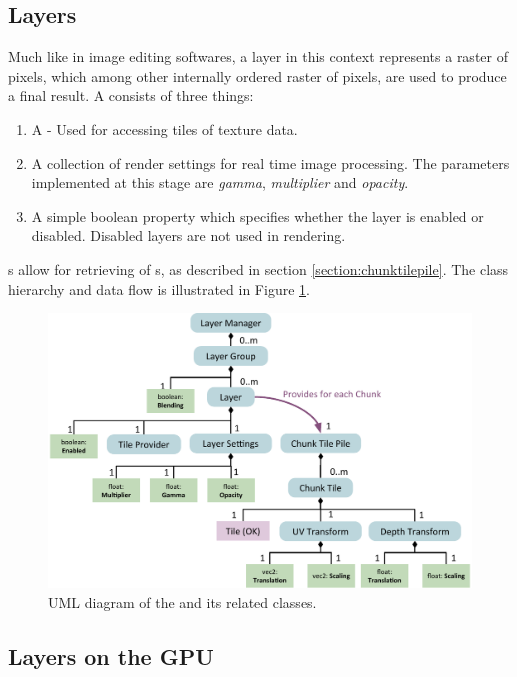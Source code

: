 \subsection{Layers}
Much like in image editing softwares, a layer in this context represents a raster of pixels, which among other internally ordered raster of pixels, are used to produce a final result. A  consists of three things:

\begin{enumerate}
\item A  - Used for accessing tiles of texture data.
\item A collection of render settings for real time image processing. The parameters implemented at this stage are \emph{gamma}, \emph{multiplier} and \emph{opacity}.
\item A simple boolean property which specifies whether the layer is enabled or disabled. Disabled layers are not used in rendering.
\end{enumerate}

s allow for retrieving of s, as described in section \ref{section:chunktilepile}. The class hierarchy and data flow is illustrated in Figure \ref{fig:layermanager}.

\begin{figure}[htbp]
    \centering
    \includegraphics[width=\textwidth]{figures/implementation/layers/layermanager.pdf}
    \caption{UML diagram of the  and its related classes.}
    \label{fig:layermanager}
\end{figure}

\subsection{Layers on the GPU}

